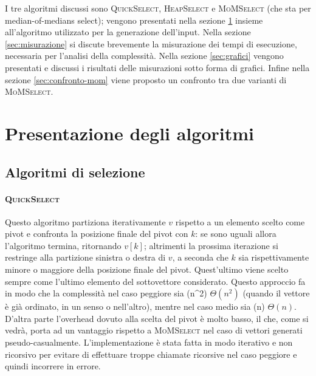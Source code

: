 \documentclass[a4paper,12pt]{article}
\newcommand{\QuickSelect}{\textsc{QuickSelect}}
\newcommand{\HeapSelect}{\textsc{HeapSelect}}
\newcommand{\MoMSelect}{\textsc{MoMSelect}}
\newcommand{\Tquad}{\ifmmode \Theta(n^2) \else $\Theta(n^2)$\fi} %
\newcommand{\Tlin}{\ifmmode \Theta(n) \else $\Theta(n)$\fi} %
\begin{document}
I tre algoritmi discussi sono \QuickSelect{}, \HeapSelect{} e \MoMSelect{} (che sta per median-of-medians select); vengono presentati nella sezione \ref{sec:presentazione-algoritmi} insieme all'algoritmo utilizzato per la generazione dell'input.
Nella sezione \ref{sec:misurazione} si discute brevemente la misurazione dei tempi di esecuzione, necessaria per l'analisi della complessità.
Nella sezione \ref{sec:grafici} vengono presentati e discussi i risultati delle misurazioni sotto forma di grafici.
Infine nella sezione \ref{sec:confronto-mom} viene proposto un confronto tra due varianti di \MoMSelect{}.



\section{Presentazione degli algoritmi}
\label{sec:presentazione-algoritmi}

\subsection{Algoritmi di selezione}
\paragraph{\QuickSelect}
Questo algoritmo partiziona iterativamente $v$ rispetto a un elemento scelto come pivot e confronta la posizione finale del pivot con $k$: se sono uguali allora l'algoritmo termina, ritornando $v[k]$; altrimenti la prossima iterazione si restringe alla partizione sinistra o destra di $v$, a seconda che $k$ sia rispettivamente minore o maggiore della posizione finale del pivot.
Quest'ultimo viene scelto sempre come l'ultimo elemento del sottovettore considerato.
Questo approccio fa in modo che la complessità nel caso peggiore sia \Tquad{} (quando il vettore è già ordinato, in un senso o nell'altro), mentre nel caso medio sia \Tlin.
D'altra parte l'overhead dovuto alla scelta del pivot è molto basso, il che, come si vedrà, porta ad un vantaggio rispetto a \MoMSelect{} nel caso di vettori generati pseudo-casualmente.
L'implementazione è stata fatta in modo iterativo e non ricorsivo per evitare di effettuare troppe chiamate ricorsive nel caso peggiore e quindi incorrere in errore.
\end{document}

